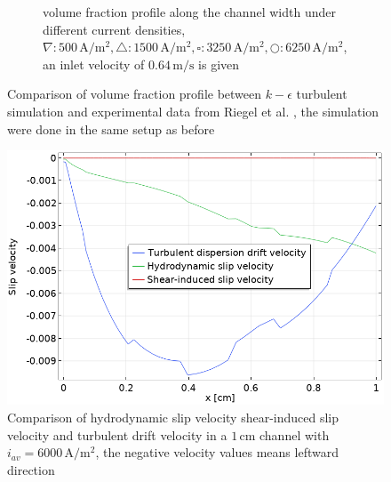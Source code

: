 \begin{figure}[H]
\begin{subfigure}{.5\textwidth}
  \caption{{volume fraction profile along the channel width \cite{riegel1998role} under different current densities,  $ \nabla: 500 \, \mathrm{A/m^2}, \triangle: 1500 \, \mathrm{A/m^2}, \square: 3250 \, \mathrm{A/m^2}, \bigcirc: 6250 \, \mathrm{A/m^2}$}, an inlet velocity of $0.64 \, \mathrm{m/s}$ is given}
\end{subfigure}
\caption{Comparison of volume fraction profile between $k-\epsilon$ turbulent simulation and experimental data from Riegel et al. \cite{riegel1998role}, the simulation were done in the same setup as before}
\label{nosaffvolumeturbulent}
\end{figure}

  \begin{figure}[H]
     \centering
     \includegraphics[scale = 0.5]{driftslipcomparison.png}
     \caption{Comparison of hydrodynamic slip velocity shear-induced slip velocity and turbulent drift velocity in a $1 \, \mathrm{cm}$ channel with $i_{av}=6000 \, \mathrm{A/m^2}$, the negative velocity values means leftward direction}
     \label{slipdriftcomparison}
 \end{figure}


